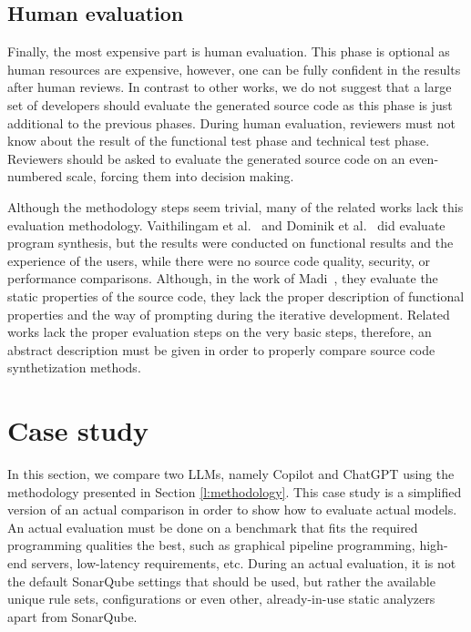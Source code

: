 \subsection{Human evaluation}

Finally, the most expensive part is human evaluation.
This phase is optional as human resources are expensive, however, one can be fully confident in the results after human reviews.
In contrast to other works, we do not suggest that a large set of developers should evaluate the generated source code as this phase is just additional to the previous phases.
During human evaluation, reviewers must not know about the result of the functional test phase and technical test phase.
Reviewers should be asked to evaluate the generated source code on an even-numbered scale, forcing them into decision making.

Although the methodology steps seem trivial, many of the related works lack this evaluation methodology.
Vaithilingam et al.~\cite{copilot_code_evaluation} and Dominik et al.~\cite{copilot_code_evaluation2} did evaluate program synthesis, but the results were conducted on functional results and the experience of the users, while there were no source code quality, security, or performance comparisons.
Although, in the work of Madi~\cite{copilot_code_evaluation_3}, they evaluate the static properties of the source code, they lack the proper description of functional properties and the way of prompting during the iterative development.
Related works lack the proper evaluation steps on the very basic steps, therefore, an abstract description must be given in order to properly compare source code synthetization methods.
\section{Case study}
\label{l:results}

In this section, we compare two LLMs, namely Copilot and ChatGPT using the methodology presented in Section \ref{l:methodology}.
This case study is a simplified version of an actual comparison in order to show how to evaluate actual models.
An actual evaluation must be done on a benchmark that fits the required programming qualities the best, such as graphical pipeline programming, high-end servers, low-latency requirements, etc.
During an actual evaluation, it is not the default SonarQube settings that should be used, but rather the available unique rule sets, configurations or even other, already-in-use static analyzers apart from SonarQube.

